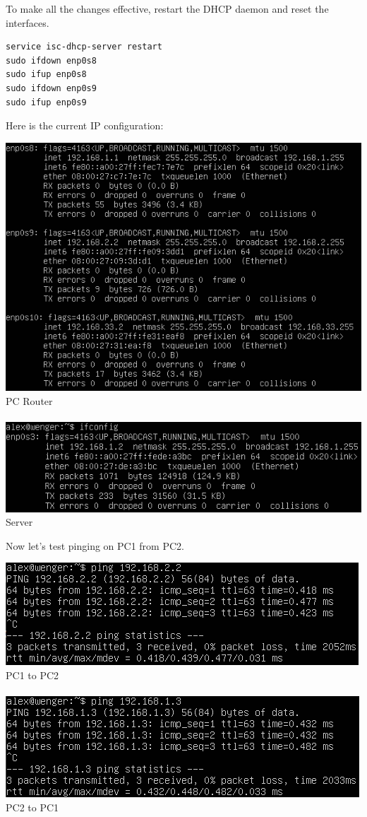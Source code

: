 \documentclass[12pt]{extarticle}
\begin{document}
To make all the changes effective, restart the DHCP daemon and reset the interfaces.
\begin{verbatim}
service isc-dhcp-server restart
sudo ifdown enp0s8
sudo ifup enp0s8
sudo ifdown enp0s9
sudo ifup enp0s9
\end{verbatim}
Here is the current IP configuration:
\begin{center}
\includegraphics[scale=0.8]{resources/3-1-3.png}\\
PC Router\\~\\
\includegraphics[scale=0.8]{resources/3-2-1.png}\\
Server
\end{center}
Now let's test pinging on PC1 from PC2.
\begin{center}
\includegraphics[scale=0.8]{resources/3-3-1.png}\\
PC1 to PC2\\~\\
\includegraphics[scale=0.8]{resources/3-3-2.png}\\
PC2 to PC1
\end{center}
\end{document}
